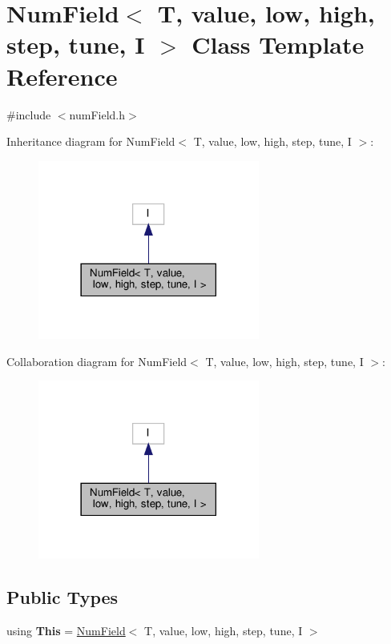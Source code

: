 \hypertarget{classNumField}{}\section{Num\+Field$<$ T, value, low, high, step, tune, I $>$ Class Template Reference}
\label{classNumField}


{\ttfamily \#include $<$num\+Field.\+h$>$}



Inheritance diagram for Num\+Field$<$ T, value, low, high, step, tune, I $>$\+:
\nopagebreak
\begin{figure}[H]
\begin{center}
\leavevmode
\includegraphics[width=206pt]{classNumField__inherit__graph}
\end{center}
\end{figure}


Collaboration diagram for Num\+Field$<$ T, value, low, high, step, tune, I $>$\+:
\nopagebreak
\begin{figure}[H]
\begin{center}
\leavevmode
\includegraphics[width=206pt]{classNumField__coll__graph}
\end{center}
\end{figure}
\subsection*{Public Types}
\begin{DoxyCompactItemize}
\item 
\mbox{\label{classNumField_a2f08690bb95c68a70e2941d5cdd4b85c}} 
using {\bfseries This} = \hyperlink{classNumField}{Num\+Field}$<$ T, value, low, high, step, tune, I $>$
\end{DoxyCompactItemize}
